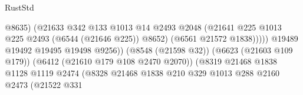 \begin{lexlean}{RustStd}
\begin{coremodule}
                                                            @8635)
                                                          (@21633
                                                            @342
                                                            @133
                                                            @1013
                                                            @14
                                                            @2493
                                                            @2048
                                                            (@21641
                                                              @225
                                                              @1013
                                                              @225
                                                              @2493
                                                              (@6544 (@21646 @225))
                                                              @8652)
                                                            (@6561 @21572 @1838)))))
                                                    @19489
                                                    @19492
                                                    @19495
                                                    @19498
                                                    @9256))
                                                (@8548 (@21598 @32))
                                                (@6623 (@21603 @109 @179))
                                                (@6412 (@21610 @179 @108 @2470 @2070))
                                                (@8319
                                                  @21468
                                                  @1838
                                                  @1128
                                                  @1119
                                                  @2474
                                                  (@8328
                                                    @21468
                                                    @1838
                                                    @210
                                                    @329
                                                    @1013
                                                    @288
                                                    @2160
                                                    @2473
                                                    (@21522
                                                      @331

\end{coremodule}
\end{lexlean}
